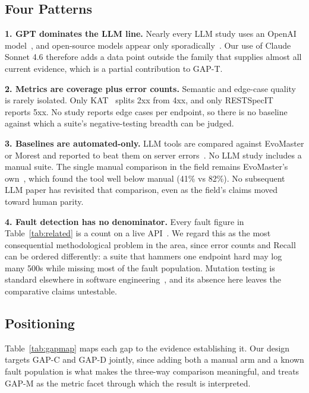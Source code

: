 \subsection{Four Patterns}

\textbf{1. GPT dominates the LLM line.}
Nearly every LLM study uses an OpenAI
model~\cite{kat,restspecit,restgpt,autoresttest,logiagent,restifai,apitestgenie}, and
open-source models appear only sporadically~\cite{llamaresttest}. Our use of Claude Sonnet 4.6
therefore adds a data point outside the family that supplies almost all current evidence,
which is a partial contribution to GAP-T.

\textbf{2. Metrics are coverage plus error counts.}
Semantic and edge-case quality is rarely isolated. Only KAT~\cite{kat} splits 2xx from 4xx,
and only RESTSpecIT~\cite{restspecit} reports 5xx. No study reports edge cases per endpoint,
so there is no baseline against which a suite's negative-testing breadth can be judged.

\textbf{3. Baselines are automated-only.}
LLM tools are compared against EvoMaster or Morest and reported to beat them on server
errors~\cite{llamaresttest,autoresttest}. No LLM study includes a manual suite. The single
manual comparison in the field remains EvoMaster's own~\cite{evomaster}, which found the tool
well below manual (41\% vs 82\%). No subsequent LLM paper has revisited that comparison, even
as the field's claims moved toward human parity.

\textbf{4. Fault detection has no denominator.}
Every fault figure in Table~\ref{tab:related} is a count on a live
API~\cite{llamaresttest,autoresttest,logiagent,notimetorest,evomaster,morest}. We regard this
as the most consequential methodological problem in the area, since error counts and Recall
can be ordered differently: a suite that hammers one endpoint hard may log many 500s while
missing most of the fault population. Mutation testing is standard elsewhere in software
engineering~\cite{pit,offutt}, and its absence here leaves the comparative claims untestable.

\subsection{Positioning}
Table~\ref{tab:gapmap} maps each gap to the evidence establishing it. Our design targets
GAP-C and GAP-D jointly, since adding both a manual arm and a known fault population is what
makes the three-way comparison meaningful, and treats GAP-M as the metric facet through which
the result is interpreted.

